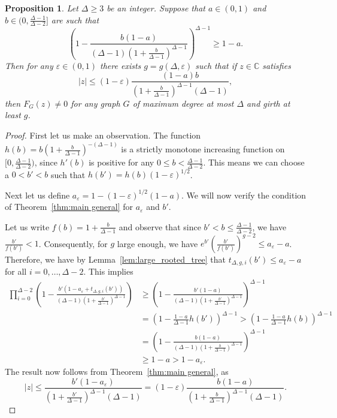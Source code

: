 \documentclass[a4paper,11pt,reqno]{amsart}
\newtheorem{proposition}[corollary]{Proposition}
\numberwithin{equation}{section}
\begin{document}
\begin{proposition}\label{prop:main general large girth}
    Let $\Delta\ge 3$ be an integer. Suppose that $a\in (0,1)$ and $b\in(0,\tfrac{\Delta-1}{\Delta-2}]$ are such that  
    \[
       \left(1-\frac{b(1-a)}{(\Delta-1)(1+\tfrac{b}{\Delta-1})^{\Delta-1}}\right)^{\Delta-1} \ge  1-a.
    \]
Then for any $\varepsilon\in (0,1)$ there exists $g=g(\Delta,\varepsilon)$ such that if $z\in\mathbb{C}$ satisfies \[|z|\le (1-\varepsilon)\frac{(1-a)b}{(1+\tfrac{b}{\Delta-1})^{\Delta-1}(\Delta-1)},\] then $F_G(z)\neq 0$ for any graph $G$ of maximum degree at most $\Delta$  and girth at least $g$.
\end{proposition}
\begin{proof}
First let us make an observation. The function $h(b)=b(1+\tfrac{b}{\Delta-1})^{-(\Delta-1)}$ is a strictly monotone increasing function on $[0,\tfrac{\Delta-1}{\Delta-2})$, since $h'(b)$ is positive for any $0\le b<\tfrac{\Delta-1}{\Delta-2}$. This means we can choose a $0<b'<b$ such that $h(b')=h(b)(1-\varepsilon)^{1/2}$.

Next let us define $a_\varepsilon=1-(1-\varepsilon)^{1/2}(1-a)$. 
We will now verify the condition of Theorem~\ref{thm:main general} for $a_\varepsilon$ and $b'$.

Let us write $f(b)=1+\tfrac{b}{\Delta-1}$ and observe that since $b'<b\leq \tfrac{\Delta-1}{\Delta-2}$, we have $\tfrac{b'}{f(b')}<1$.
Consequently, for $g$ large enough, we have $e^{b'}\left(\tfrac{b'}{f(b')}\right)^{g-2}\leq a_\varepsilon-a$. 
Therefore, we have by Lemma~\ref{lem:large_rooted_tree} that $t_{\Delta,g,i}(b')\leq a_\varepsilon-a$ for all $i=0,\ldots,\Delta-2$.
This implies
\begin{align*}
    \prod_{i=0}^{\Delta-2}\left(1-\frac{b'\left(1-a_\varepsilon+t_{\Delta,g,i}(b')\right)}{(\Delta-1)(1+\tfrac{b'}{\Delta-1})^{\Delta-1}}\right)&\geq \left(1-\frac{b'(1-a)}{(\Delta-1)(1+\tfrac{b'}{\Delta-1})^{\Delta-1}} \right)^{\Delta-1}
    \\
    &=\left(1-\frac{1-a}{\Delta-1}h(b')\right)^{\Delta-1}>\left(1-\frac{1-a}{\Delta-1}h(b)\right)^{\Delta-1}
    \\
    &=\left(1-\frac{b(1-a)}{(\Delta-1)(1+\tfrac{b}{\Delta-1})^{\Delta-1}}\right)^{\Delta-1}
    \\
    &\geq 1-a>1-a_\varepsilon.
\end{align*}
The result now follows from Theorem~\ref{thm:main general}, as
\[
|z|\le\frac{b'(1-a_\varepsilon)}{(1+\frac{b'}{\Delta-1})^{\Delta-1}(\Delta-1)}=(1-\varepsilon)\frac{b(1-a)}{(1+\frac{b}{\Delta-1})^{\Delta-1}(\Delta-1)}.
\]




\end{proof}
\end{document}
